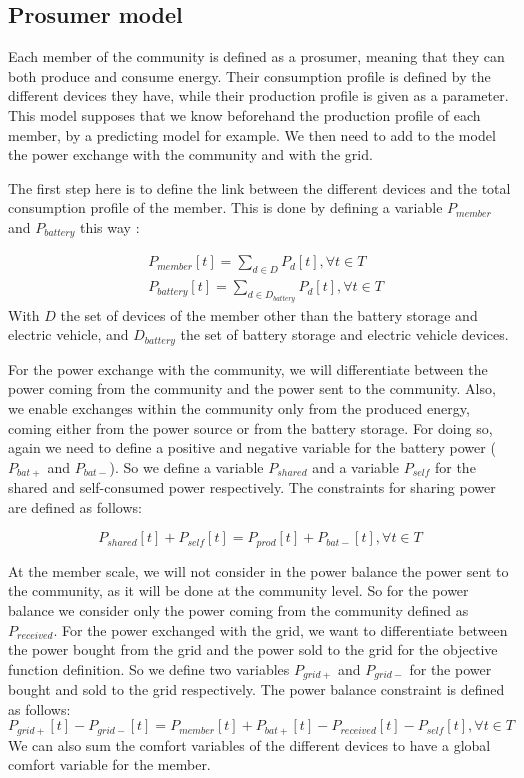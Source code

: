 \subsection{Prosumer model}

Each member of the community is defined as a prosumer, meaning that they can both produce and consume energy. Their consumption profile is defined by the different devices they have, while their production profile is given as a parameter. This model supposes that we know beforehand the production profile of each member, by a predicting model for example. We then need to add to the model the power exchange with the community and with the grid.

The first step here is to define the link between the different devices and the total consumption profile of the member. This is done by defining a variable $P_{member}$ and $P_{battery}$ this way : 

\begin{align}
    &P_{member}[t] = \sum_{d \in D} P_{d}[t], \forall t \in T \\ 
    &P_{battery}[t] = \sum_{d \in D_{battery}} P_{d}[t], \forall t \in T
\end{align}
With $D$ the set of devices of the member other than the battery storage and electric vehicle, and $D_{battery}$ the set of battery storage and electric vehicle devices.

For the power exchange with the community, we will differentiate between the power coming from the community and the power sent to the community. Also, we enable exchanges within the community only from the produced energy, coming either from the power source or from the battery storage. For doing so, again we need to define a positive and negative variable for the battery power ($P_{bat+}$ and $P_{bat-}$). So we define a variable $P_{shared}$ and a variable $P_{self}$ for the shared and self-consumed power respectively. The constraints for sharing power are defined as follows:

\begin{equation}
    P_{shared}[t] + P_{self}[t] = P_{prod}[t] + P_{bat-}[t], \forall t \in T
\end{equation}

At the member scale, we will not consider in the power balance the power sent to the community, as it will be done at the community level. So for the power balance we consider only the power coming from the community defined as $P_{received}$. For the power exchanged with the grid, we want to differentiate between the power bought from the grid and the power sold to the grid for the objective function definition. So we define two variables $P_{grid+}$ and $P_{grid-}$ for the power bought and sold to the grid respectively. The power balance constraint is defined as follows:
\begin{equation}
    P_{grid+}[t] - P_{grid-}[t] = P_{member}[t] + P_{bat+}[t] - P_{received}[t] - P_{self}[t], \forall t \in T
\end{equation}
We can also sum the comfort variables of the different devices to have a global comfort variable for the member.

